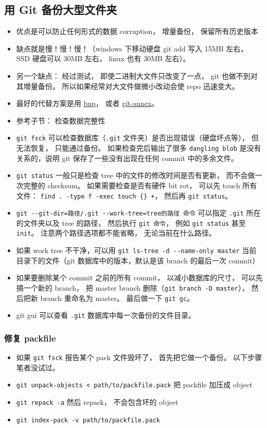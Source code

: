\subsection{用 Git 备份大型文件夹}
\begin{itemize}
\item 优点是可以防止任何形式的数据 corruption， 增量备份， 保留所有历史版本
\item 缺点就是慢！慢！慢！（windows 下移动硬盘 git add 写入 15MB 左右， SSD 硬盘可以 30MB 左右， linux 也有 30MB 左右）。
\item 另一个缺点： 经过测试， 即使二进制大文件只改变了一点， git 也做不到对其增量备份。 所以如果经常对大文件做微小改动会使 repo 迅速变大。
\item 最好的代替方案是用 \href{https://bup.github.io/}{bup}， 或者 \href{https://git-annex.branchable.com/}{git-annex}。
\item 参考子节： 检查数据完整性
\item \verb|git fsck| 可以检查数据库（\verb|.git| 文件夹）是否出现错误（硬盘坏点等）， 但无法恢复， 只能通过备份。 如果检查完后输出了很多 \verb|dangling blob| 是没有关系的，说明 git 保存了一些没有出现在任何 commit 中的多余文件。
\item \verb|git status| 一般只是检查 tree 中的文件的修改时间是否有更新， 而不会做一次完整的 checksum。 如果需要检查是否有硬件 bit rot， 可以先 touch 所有文件： \verb|find . -type f -exec touch {} +|， 然后再 \verb|git status|。
\item \verb|git --git-dir=路径/.git --work-tree=tree的路径 命令| 可以指定 \verb|.git| 所在的文件夹以及 tree 的路径， 然后执行 \verb|git 命令|， 例如 \verb|git status| 甚至 \verb|init|。 注意两个路径选项都不能省略， 无论当前在什么路径。
\item 如果 work tree 不干净，可以用 \verb`git ls-tree -d --name-only master` 当前目录下的文件（git 数据库中的版本，默认是该 branch 的最后一次 commit）
\item 如果要删除某个 commit 之前的所有 commit， 以减小数据库的尺寸， 可以先搞一个新的 branch， 把 master branch 删除（\verb|git branch -D master|）， 然后把新 branch 重命名为 master。 最后做一下 \verb|git gc|。
\item git gui 可以查看 \verb|.git| 数据库中每一次备份的文件目录。
\end{itemize}

\subsubsection{修复 packfile}
\begin{itemize}
\item 如果 \verb|git fsck| 报告某个 pack 文件毁坏了， 首先把它做一个备份。 以下步骤笔者没试过。
\item \verb|git unpack-objects < path/to/packfile.pack| 把 packfile 加压成 object
\item \verb|git repack -a| 然后 repack， 不会包含坏的 object
\item \verb|git index-pack -v path/to/packfile.pack| 
\end{itemize}


